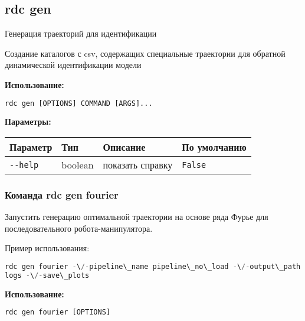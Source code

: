 \hypertarget{rdc-gen}{%
\subsection{rdc gen}\label{rdc-gen}}

Генерация траекторий для идентификации

Создание каталогов с csv, содержащих специальные траектории для обратной динамической идентификации модели

\textbf{Использование:}
\begin{lstlisting}[language=python, numbers=none, frame=single]
rdc gen [OPTIONS] COMMAND [ARGS]...
\end{lstlisting}

\textbf{Параметры:}
\begin{center}
\fontsize{10pt}{10pt}\selectfont
\begin{longtable}[]{p{5cm}|p{2cm}|p{3.5cm}|p{5cm}}
    \hline
\toprule()
Параметр & Тип & Описание & По умолчанию \\
\hline
\midrule()
\endhead
\texttt{-\/-help} & boolean & показать справку &
\texttt{False} \\
\bottomrule()
\hline
\end{longtable}
\end{center}

\hypertarget{rdc-gen-fourier}{%
\subsubsection{ Команда rdc gen fourier}\label{rdc-gen-fourier}}

Запустить генерацию оптимальной траектории на основе ряда Фурье для последовательного робота-манипулятора.

Пример использования:
\begin{lstlisting}[language=python, numbers=none, frame=single]
rdc gen fourier -\/-pipeline\_name pipeline\_no\_load -\/-output\_path
logs -\/-save\_plots
\end{lstlisting}

\textbf{Использование:}
\begin{lstlisting}[language=python, numbers=none, frame=single]
rdc gen fourier [OPTIONS]
\end{lstlisting}

